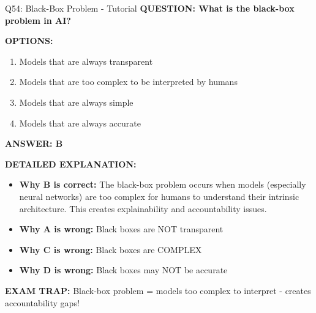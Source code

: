 \documentclass[8pt]{beamer}
\begin{document}
	\begin{frame}{Q54: Black-Box Problem - Tutorial}
		\fontsize{6.5}{7.5}\selectfont
		\textbf{QUESTION: What is the black-box problem in AI?}
		
		\vspace{0.1cm}
		\textbf{OPTIONS:}
		\begin{enumerate}
			\item Models that are always transparent
			\item Models that are too complex to be interpreted by humans
			\item Models that are always simple
			\item Models that are always accurate\end{enumerate}
		
		\vspace{0.1cm}
		\textcolor{myblue}{\textbf{ANSWER: B}}
		
		\vspace{0.1cm}
		\textbf{DETAILED EXPLANATION:}
		\begin{itemize}
			\item \textbf{Why B is correct:} The black-box problem occurs when models (especially neural networks) are too complex for humans to understand their intrinsic architecture. This creates explainability and accountability issues.
			\item \textbf{Why A is wrong:} Black boxes are NOT transparent
			\item \textbf{Why C is wrong:} Black boxes are COMPLEX
			\item \textbf{Why D is wrong:} Black boxes may NOT be accurate
		\end{itemize}
		
		\textcolor{myred}{\textbf{EXAM TRAP:}} Black-box problem = \textcolor{myblue}{models too complex to interpret} - creates accountability gaps!
	\end{frame}
	
\end{document}
